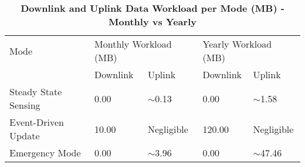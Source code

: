 \begin{table}[ht!]
    \centering
    \small
    \begin{tabularx}{1.1\columnwidth}{l|X|X|X|X}
    \toprule
    Mode & \multicolumn{2}{X|}{Monthly Workload (MB)} & \multicolumn{2}{X}{Yearly Workload (MB)} \\
    \cmidrule(lr){2-3} \cmidrule(lr){4-5}
     & Downlink & Uplink & Downlink & Uplink \\
    \midrule
    Steady State Sensing & 0.00 & $\sim$0.13 & 0.00 & $\sim$1.58 \\
    Event-Driven Update & 10.00 & Negligible & 120.00 & Negligible \\
    Emergency Mode & 0.00 & $\sim$3.96 & 0.00 & $\sim$47.46 \\
    \bottomrule
    \end{tabularx}
    \caption{\textbf{Downlink and Uplink Data Workload per Mode (MB) - Monthly vs Yearly}}
    \label{tab:data_workload}
\end{table}